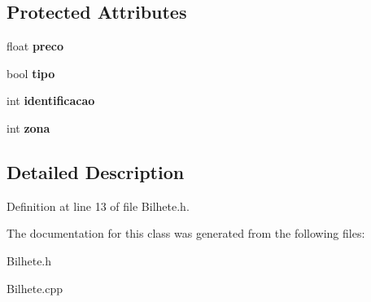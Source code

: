 \subsection*{Protected Attributes}
\begin{DoxyCompactItemize}
\item 
\mbox{\label{classBilhete_a793d8499d737bdc6bebcaac9d1164b77}} 
float {\bfseries preco}
\item 
\mbox{\label{classBilhete_aef44378e8a64a61dfe96df101ed78ec7}} 
bool {\bfseries tipo}
\item 
\mbox{\label{classBilhete_a4f6fbe2f43b802ac4dc20a4c6071efff}} 
int {\bfseries identificacao}
\item 
\mbox{\label{classBilhete_a0ff3b5e577a35f612715f431d85c19aa}} 
int {\bfseries zona}
\end{DoxyCompactItemize}


\subsection{Detailed Description}


Definition at line 13 of file Bilhete.\+h.



The documentation for this class was generated from the following files\+:\begin{DoxyCompactItemize}
\item 
Bilhete.\+h\item 
Bilhete.\+cpp\end{DoxyCompactItemize}

